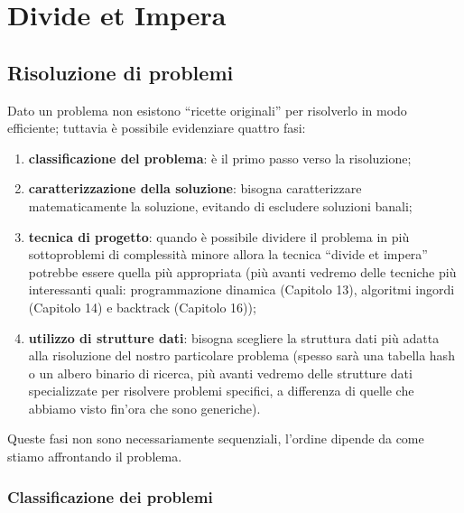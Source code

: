
\ifsubfile
\usepackage{../settings/subfile}
\setcounter{chapter}{10}


\fi
\chapter{Divide et Impera}

\section{Risoluzione di problemi}

Dato un problema non esistono \enquote{ricette originali} per risolverlo in modo efficiente;
tuttavia è possibile evidenziare quattro fasi:
\begin{enumerate}
	\item \textbf{classificazione del problema}: è il primo passo verso la risoluzione;
	\item \textbf{caratterizzazione della soluzione}: bisogna caratterizzare matematicamente la soluzione, evitando di escludere soluzioni banali;
	\item \textbf{tecnica di progetto}: quando è possibile dividere il problema in più sottoproblemi di complessità minore allora la tecnica \enquote{divide et impera} potrebbe essere quella più appropriata (più avanti vedremo delle tecniche più interessanti quali: programmazione dinamica (Capitolo 13), algoritmi ingordi (Capitolo 14) e backtrack (Capitolo 16));
	\item \textbf{utilizzo di strutture dati}: bisogna scegliere la struttura dati più adatta alla risoluzione del nostro particolare problema (spesso sarà una tabella hash o un albero binario di ricerca, più avanti vedremo delle strutture dati specializzate per risolvere problemi specifici, a differenza di quelle che abbiamo visto fin'ora che sono generiche).
\end{enumerate}
Queste fasi non sono necessariamente sequenziali, l'ordine dipende da come stiamo affrontando il problema.

\subsection{Classificazione dei problemi}

